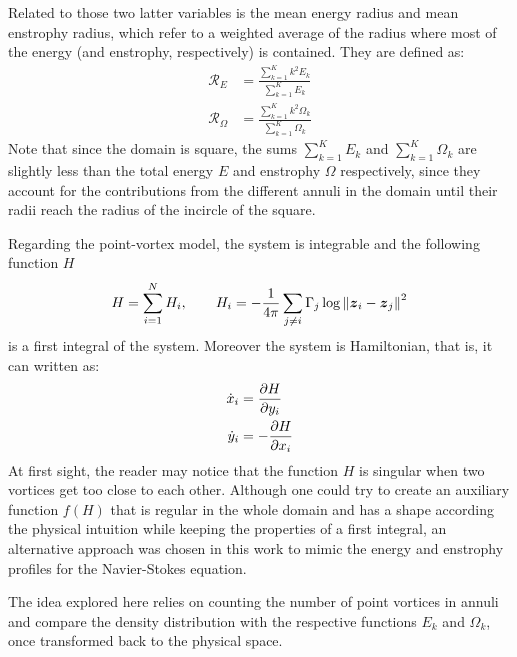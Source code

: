 \documentclass[../main.tex]{subfiles}
\begin{document}
Related to those two latter variables is the mean energy radius and mean enstrophy radius, which refer to a weighted average of the radius where most of the energy (and enstrophy, respectively) is contained. They are defined as:
\begin{align}
	\mathcal{R}_E      & = \frac{\sum_{k=1}^{K} k^2 E_k}{\sum_{k=1}^{K} E_k}           \\
	\mathcal{R}_\Omega & = \frac{\sum_{k=1}^{K} k^2 \Omega_k}{\sum_{k=1}^{K} \Omega_k}
\end{align}
Note that since the domain is square, the sums $\sum_{k=1}^{K} E_k$ and $\sum_{k=1}^{K} \Omega_k$ are slightly less than the total energy $E$ and enstrophy $\Omega$ respectively, since they account for the contributions from the different annuli in the domain until their radii reach the radius of the incircle of the square.

Regarding the point-vortex model, the system is integrable and the following function $H$
\begin{equation}
	H = \sum_{i=1}^{N} H_i,\qquad H_i = -\frac{1}{4\pi} \sum_{j\neq i} \Gamma_j \log{\left\|\boldsymbol{z}_i-\boldsymbol{z}_j\right\|^2}
\end{equation}
is a first integral of the system. Moreover the system is Hamiltonian, that is, it can written as:
\begin{align}
	\dot{x}_i & = \pdv{H}{y_i}  \\
	\dot{y}_i & = -\pdv{H}{x_i}
\end{align}
At first sight, the reader may notice that the function $H$ is singular when two vortices get too close to each other. Although one could try to create an auxiliary function $f(H)$ that is regular in the whole domain and has a shape according the physical intuition while keeping the properties of a first integral, an alternative approach was chosen in this work to mimic the energy and enstrophy profiles for the Navier-Stokes equation.

The idea explored here relies on counting the number of point vortices in annuli and compare the density distribution with the respective functions $E_k$ and $\Omega_k$, once transformed back to the physical space.
\end{document}
